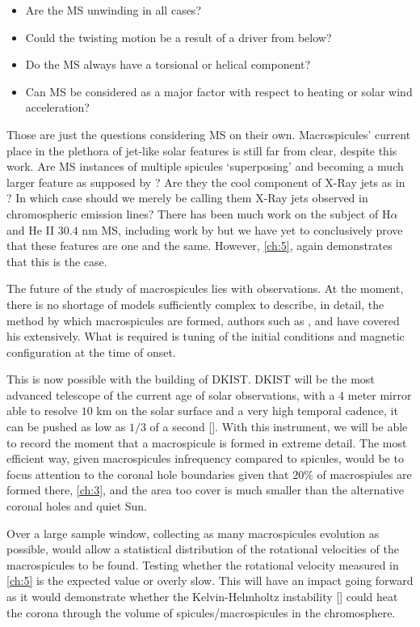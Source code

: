 \begin{itemize}
	\item{Are the MS unwinding in all cases?}
	\item{Could the twisting motion be a result of a driver from below?}
	\item{Do the MS always have a torsional or helical component?}
	\item{Can MS be considered as a major factor with respect to heating or solar wind acceleration?}
\end{itemize}
 
 
Those are just the questions considering MS on their own.
Macrospicules' current place in the plethora of jet-like solar features is still far from clear, despite this work.
Are MS instances of multiple spicules `superposing' and becoming a much larger feature as supposed by \cite{Xia2005}?
Are they the cool component of X-Ray jets as in \cite{Parenti2002}? In which case should we merely be calling them X-Ray jets observed in chromospheric emission lines?
There has been much work on the subject of H$\alpha$ and He II $30.4$ nm MS, including work by \cite{LaBonte79,Wang1998} but we have yet to conclusively prove that these features are one and the same.
However, \cref{ch:5}, again demonstrates that this is the case.
 
The future of the study of macrospicules lies with observations.
At the moment, there is no shortage of models sufficiently complex to describe, in detail, the method by which macrospicules are formed, authors such as \cite{Murawski2011}, \cite{Archontis2005} and \cite{Moreno2008} have covered his extensively.
What is required is tuning of the initial conditions and magnetic configuration at the time of onset.

This is now possible with the building of DKIST.
DKIST will be the most advanced telescope of the current age of solar observations, with a 4 meter mirror able to resolve $10$ km on the solar surface and a very high temporal cadence, it can be pushed as low as $1/3$ of a second [\cite{Woeger2016}].
With this instrument, we will be able to record the moment that a macrospicule is formed in extreme detail.
The most efficient way, given macrospicules infrequency compared to spicules, would be to focus attention to the coronal hole boundaries given that $20\%$ of macrospiules are formed there, \cref{ch:3}, and the area too cover is much smaller than the alternative coronal holes and quiet Sun.

Over a large sample window, collecting as many macrospicules evolution as possible, would allow a statistical distribution of the rotational velocities of the macrospicules to be found.
Testing whether the rotational velocity measured in \cref{ch:5} is the expected value or overly slow.
This will have an impact going forward as it would demonstrate whether the Kelvin-Helmholtz instability [\cite{Zaqarashvili2014}] could heat the corona through the volume of spicules/macrospicules in the chromosphere. 

